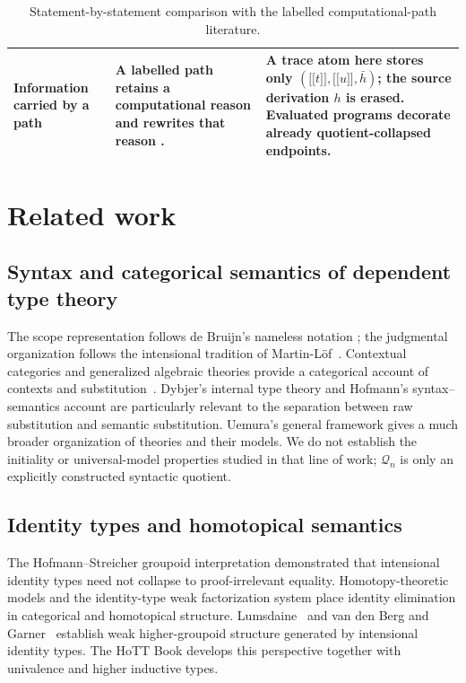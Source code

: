 \documentclass[10pt,reqno]{amsart}
\newcommand{\den}[1]{\mathopen{\lbrack\!\lbrack}#1\mathclose{\rbrack\!\rbrack}}
\newcommand{\Q}{\mathcal{Q}}
\begin{document}
\begin{table}[ht]
\begin{tabular}{>{\raggedright\arraybackslash}p{}
                >{\raggedright\arraybackslash}p{}
                >{\raggedright\arraybackslash}p{}}
Information carried by a path
& A labelled path retains a computational reason and rewrites that reason
  \cite{RamosEtAl2018,RamosEtAl2026}.
& A trace atom here stores only
  \((\den t,\den u,\bar h)\); the source derivation \(h\) is erased.
  Evaluated programs decorate already quotient-collapsed endpoints.\\
\bottomrule
\end{tabular}
\caption{Statement-by-statement comparison with the labelled
computational-path literature.}
\label{tab:comparison}
\end{table}

\section{Related work}
\label{sec:related}

\subsection{Syntax and categorical semantics of dependent type theory}

The scope representation follows de Bruijn's nameless notation
\cite{deBruijn1972}; the judgmental organization follows the intensional
tradition of Martin-L\"of~\cite{MartinLof1984}.  Contextual categories and generalized
algebraic theories provide a categorical account of contexts and
substitution~\cite{Cartmell1986}.  Dybjer's internal type theory
\cite{Dybjer1996} and Hofmann's syntax--semantics account
\cite{Hofmann1997} are particularly relevant to the separation between raw
substitution and semantic substitution.  Uemura's general framework
\cite{Uemura2023} gives a much broader organization of theories and their
models.  We do not establish the initiality or universal-model properties
studied in that line of work; \(\Q_n\) is only an explicitly constructed
syntactic quotient.

\subsection{Identity types and homotopical semantics}

The Hofmann--Streicher groupoid interpretation
\cite{HofmannStreicher1998} demonstrated that intensional identity types need
not collapse to proof-irrelevant equality.  Homotopy-theoretic models
\cite{AwodeyWarren2009} and the identity-type weak factorization system
\cite{GambinoGarner2008} place identity elimination in categorical and
homotopical structure.  Lumsdaine~\cite{Lumsdaine2010} and van den Berg and
Garner~\cite{vanDenBergGarner2011} establish weak higher-groupoid structure
generated by intensional identity types.  The HoTT Book
\cite{HoTTBook2013} develops this perspective together with univalence and
higher inductive types.
\end{document}
